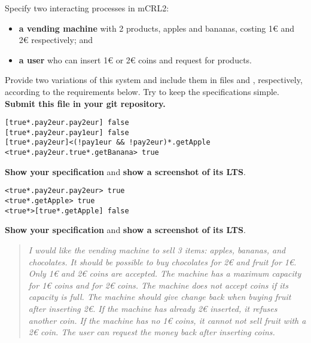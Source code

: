 \documentclass[11pt]{article}
\begin{document}
\begin{myExercise} \label{ex:vm}
Specify two interacting processes in mCRL2:
\begin{itemize}
  \item \textbf{a vending machine} with 2 products, apples and bananas, costing 1€ and 2€ respectively; and
  \item \textbf{a user} who can insert 1€ or 2€ coins and request for products.
\end{itemize}
Provide two variations of this system and include them in files  and , respectively, according to the requirements below. Try to keep the specifications simple. \textbf{Submit this file in your git repository.}

\vspace{-6mm}
\begin{lstlisting}
[true*.pay2eur.pay2eur] false
[true*.pay2eur.pay1eur] false
[true*.pay2eur]<(!pay1eur && !pay2eur)*.getApple
<true*.pay2eur.true*.getBanana> true \end{lstlisting}
\textbf{Show your specification} and \textbf{show a screenshot of its LTS}.

\vspace{2mm}
\vspace{-6mm}
\begin{lstlisting}
<true*.pay2eur.pay2eur> true
<true*.getApple> true
<true*>[true*.getApple] false\end{lstlisting}
\textbf{Show your specification} and \textbf{show a screenshot of its LTS}.

\vspace{2mm}
\begin{quote}\it
  I would like the vending machine to sell 3 items: apples, bananas, and chocolates.
  It should be possible to buy chocolates for 2€ and fruit for 1€.
  Only 1€ and 2€ coins are accepted.
  The machine has a maximum capacity for 1€ coins and for 2€ coins. 
  The machine does not accept coins if its capacity is full.
  The machine should give change back when buying fruit after inserting 2€.
  If the machine has already 2€ inserted, it refuses another coin.
  If the machine has no 1€ coins, it cannot not sell fruit with a 2€ coin. 
  The user can request the money back after inserting coins.
\end{quote}
\end{myExercise}
\end{document}
